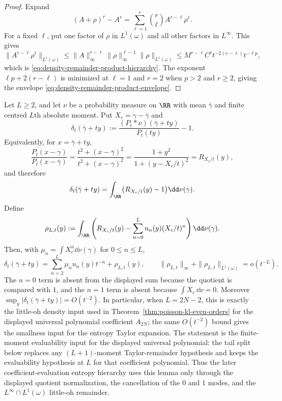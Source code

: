 \begin{proof}
Expand
\[
(A+\rho)^r-A^r
=\sum_{\ell=1}^r\binom r\ell A^{r-\ell}\rho^\ell .
\]
For a fixed $\ell$, put one factor of $\rho$ in $L^1(\omega)$ and all other
factors in $L^\infty$.  This gives
\[
\|A^{r-\ell}\rho^\ell\|_{L^1(\omega)}
\le
\|A\|_\infty^{r-\ell}\|\rho\|_\infty^{\ell-1}
\|\rho\|_{L^1(\omega)}
\le
M^{r-\ell}C^\ell
t^{-2(r-\ell)}t^{-\ell p},
\]
which is \eqref{eq:density-remainder-product-hierarchy}.  The exponent
$\ell p+2(r-\ell)$ is minimized at $\ell=1$ and $r=2$ when $p>2$ and
$r\ge2$, giving the envelope \eqref{eq:density-remainder-product-envelope}.
\end{proof}

\begin{lemma}%
\label{lem:exact-moment-density-truncation}
Let \(L\ge2\), and let \(\nu\) be a probability measure on \(\RR\) with
mean \(\bar{\gamma}\) and finite centred \(L\)th absolute moment.  Put
\(X_c=\gamma-\bar{\gamma}\) and
\[
\delta_t(\bar{\gamma}+ty)
:=
\frac{(P_t*\nu)(\bar{\gamma}+ty)}{P_t(ty)}-1 .
\]
Equivalently, for \(x=\bar{\gamma}+ty\),
\[
\frac{P_t(x-\gamma)}{P_t(x-\bar{\gamma})}
=\frac{t^2+(x-\bar{\gamma})^2}{t^2+(x-\gamma)^2}
=\frac{1+y^2}{1+(y-X_c/t)^2}
=R_{X_c/t}(y),
\]
and therefore
\[
\delta_t(\bar{\gamma}+ty)
=\int_{\RR}\bigl(R_{X_c/t}(y)-1\bigr)\dd\nu(\gamma).
\]
Define
\[
\rho_{L,t}(y):=
\int_{\RR}\left(
R_{X_c/t}(y)-\sum_{n=0}^{L}u_n(y)(X_c/t)^n
\right)\dd\nu(\gamma).
\]
Then, with \(\mu_n=\int X_c^n\dd\nu(\gamma)\) for \(0\le n\le L\),
\begin{equation}\label{eq:exact-moment-density-truncation}
\delta_t(\bar{\gamma}+ty)
=
\sum_{n=2}^{L}\mu_nu_n(y)t^{-n}+\rho_{L,t}(y),
\qquad
\|\rho_{L,t}\|_{\infty}+\|\rho_{L,t}\|_{L^1(\omega)}=o(t^{-L}).
\end{equation}
The \(n=0\) term is absent from the displayed sum because the quotient is
compared with \(1\), and the \(n=1\) term is absent because
\(\int X_c\,\dd\nu=0\).
Moreover \(\sup_y|\delta_t(\bar{\gamma}+ty)|=O(t^{-2})\).
In particular, when \(L=2N-2\), this is exactly the little-oh density input
used in Theorem~\ref{thm:poisson-kl-even-orders} for the displayed universal
polynomial coefficient \(A_{2N}\); the same \(O(t^{-2})\) bound gives the
smallness input for the entropy Taylor expansion.  The statement is the
finite-moment evaluability input for the displayed universal polynomial:
the tail split below replaces any \((L+1)\)-moment Taylor-remainder
hypothesis and keeps the evaluability hypothesis at \(L\) for that coefficient
polynomial.
Thus the later coefficient-evaluation
entropy hierarchy uses this lemma only through the displayed quotient
normalization, the cancellation of the \(0\) and \(1\) modes, and the
\(L^\infty\cap L^1(\omega)\) little-oh remainder.
\end{lemma}

